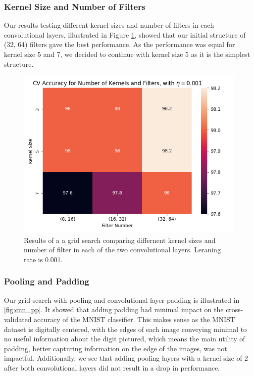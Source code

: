 \subsubsection{Kernel Size and Number of Filters}
Our results testing different kernel sizes and number of filters in each convolutional layers, illustrated in Figure \ref{fig:cnn_kf}, showed that our initial structure of (32, 64) filters gave the best performance. As the performance was equal for kernel size 5 and 7, we decided to continue with kernel size 5 as it is the simplest structure.
\begin{figure}[H]
    \centering
    \includegraphics[width=\textwidth]{results/cnn_grid_search/heatmap_grid_search_kf.png}
    \caption{Results of a a grid search comparing differnent kernel sizes and number of filter in each of the two convolutional layers. Leraning rate is 0.001.}
    \label{fig:cnn_kf}
\end{figure}

\newpage
\subsubsection{Pooling and Padding}
Our grid search with pooling and convolutional layer padding is illustrated in \ref{fig:cnn_pp}. It showed that adding padding had minimal impact on the cross-validated accuracy of the MNIST classifier. This makes sense as the MNIST dataset is digitally centered, with the edges of each image conveying minimal to no useful information about the digit pictured, which means the main utility of padding, better capturing information on the edge of the images, was not impactful. Additionally, we see that adding pooling layers with a kernel size of 2 after both convolutional layers did not result in a drop in performance.


